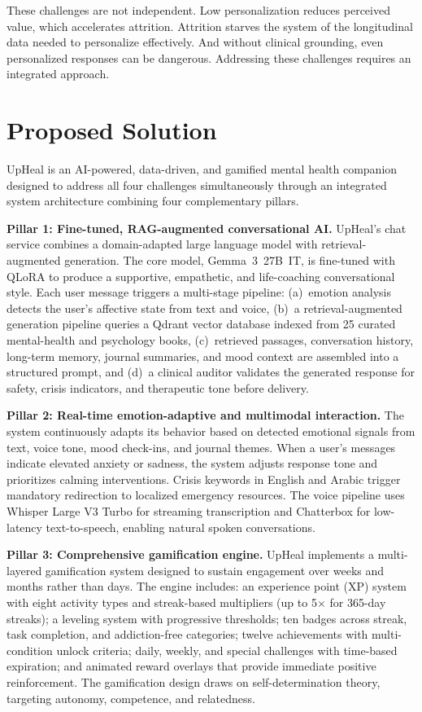 \documentclass[12pt,a4paper,oneside,openany]{report}
\begin{document}
These challenges are not independent. Low personalization reduces perceived value, which accelerates attrition. Attrition starves the system of the longitudinal data needed to personalize effectively. And without clinical grounding, even personalized responses can be dangerous. Addressing these challenges requires an integrated approach.

\section{Proposed Solution}
\label{sec:solution}

UpHeal is an AI-powered, data-driven, and gamified mental health companion designed to address all four challenges simultaneously through an integrated system architecture combining four complementary pillars.

\textbf{Pillar 1: Fine-tuned, RAG-augmented conversational AI.} UpHeal's chat service combines a domain-adapted large language model with retrieval-augmented generation. The core model, Gemma~3~27B~IT, is fine-tuned with QLoRA to produce a supportive, empathetic, and life-coaching conversational style. Each user message triggers a multi-stage pipeline: (a)~emotion analysis detects the user's affective state from text and voice, (b)~a retrieval-augmented generation pipeline queries a Qdrant vector database indexed from 25 curated mental-health and psychology books, (c)~retrieved passages, conversation history, long-term memory, journal summaries, and mood context are assembled into a structured prompt, and (d)~a clinical auditor validates the generated response for safety, crisis indicators, and therapeutic tone before delivery.

\textbf{Pillar 2: Real-time emotion-adaptive and multimodal interaction.} The system continuously adapts its behavior based on detected emotional signals from text, voice tone, mood check-ins, and journal themes. When a user's messages indicate elevated anxiety or sadness, the system adjusts response tone and prioritizes calming interventions. Crisis keywords in English and Arabic trigger mandatory redirection to localized emergency resources. The voice pipeline uses Whisper Large V3 Turbo for streaming transcription and Chatterbox for low-latency text-to-speech, enabling natural spoken conversations.

\textbf{Pillar 3: Comprehensive gamification engine.} UpHeal implements a multi-layered gamification system designed to sustain engagement over weeks and months rather than days. The engine includes: an experience point (XP) system with eight activity types and streak-based multipliers (up to 5$\times$ for 365-day streaks); a leveling system with progressive thresholds; ten badges across streak, task completion, and addiction-free categories; twelve achievements with multi-condition unlock criteria; daily, weekly, and special challenges with time-based expiration; and animated reward overlays that provide immediate positive reinforcement. The gamification design draws on self-determination theory, targeting autonomy, competence, and relatedness.
\end{document}
